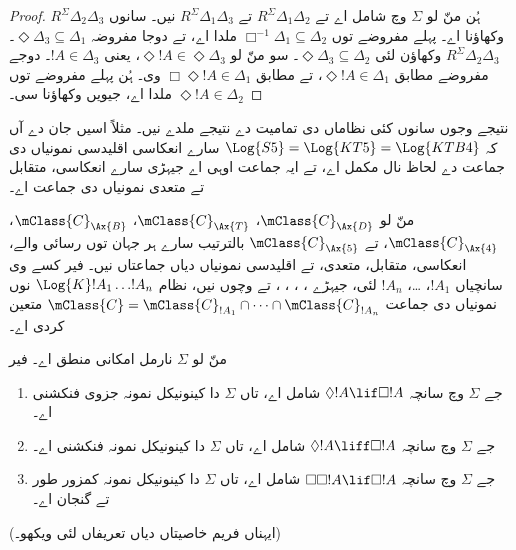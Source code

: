 \documentclass[../../../include/open-logic-section]{subfiles}
\begin{document}
\begin{proof}
  ہُن منّ لو $\Sigma$ وچ  شامل اے تے $R^\Sigma
  \Delta_1\Delta_2$ تے $R^\Sigma \Delta_1\Delta_3$ نیں۔ سانوں
  $R^\Sigma \Delta_2\Delta_3$ وکھاؤنا اے۔ پہلے مفروضے توں
  $\Box^{-1}\Delta_1 \subseteq \Delta_2$ ملدا اے، تے دوجا مفروضہ
  $\Diamond\Delta_3 \subseteq \Delta_1$۔
  $R^\Sigma
  \Delta_2\Delta_3$ وکھاؤن لئی
  $\Diamond\Delta_3 \subseteq \Delta_2$۔ سو منّ لو $\Diamond!A \in
  \Diamond\Delta_3$، یعنی $!A \in \Delta_3$۔ دوجے مفروضے مطابق
  $\Diamond!A \in \Delta_1$، تے  مطابق $\Box\Diamond!A \in
  \Delta_1$ وی۔ ہُن پہلے مفروضے توں $\Diamond!A \in
  \Delta_2$ ملدا اے، جیویں وکھاؤنا سی۔
  \end{proof}

نتیجے وجوں سانوں کئی نظاماں دی تمامیت دے نتیجے ملدے نیں۔ مثلاً اسیں جان دے آں کہ $\Log{S5} = \Log{KT5} =
\Log{KTB4}$ سارے انعکاسی اقلیدسی نمونیاں دی جماعت دے لحاظ نال مکمل اے، تے ایہ جماعت اوہی اے جیہڑی سارے انعکاسی، متقابل تے متعدی نمونیاں دی جماعت اے۔

\begin{thm}
  منّ لو $\mClass{C}_\Ax{D}$، $\mClass{C}_\Ax{T}$،
  $\mClass{C}_\Ax{B}$، $\mClass{C}_\Ax{4}$، تے
  $\mClass{C}_\Ax{5}$ بالترتیب سارے ہر جہان توں رسائی والے، انعکاسی،
  متقابل، متعدی، تے اقلیدسی نمونیاں دیاں جماعتاں نیں۔ فیر کسے وی سانچیاں $!A_1$، \dots، $!A_n$ لئی، جیہڑے ،
  ، ، ، تے  وچوں نیں، نظام
  $\Log{K}!A_1 \dots !A_n$ نوں نمونیاں دی جماعت
  $\mClass{C} = \mClass{C}_{!A_1} \cap \dots
  \cap \mClass{C}_{!A_n}$ متعین کردی اے۔
\end{thm}

\begin{prop}
  منّ لو $\Sigma$ نارمل امکانی منطق اے۔ فیر
  \begin{enumerate}
  \item{}%
    جے $\Sigma$ وچ سانچہ $\Diamond!A \lif \Box
    !A$ شامل اے، تاں $\Sigma$ دا کینونیکل نمونہ جزوی فنکشنی اے۔
  \item جے $\Sigma$ وچ سانچہ $\Diamond!A \liff \Box
    !A$ شامل اے، تاں $\Sigma$ دا کینونیکل نمونہ فنکشنی اے۔
  \item جے $\Sigma$ وچ سانچہ $\Box\Box!A \lif \Box
    !A$ شامل اے، تاں $\Sigma$ دا کینونیکل نمونہ کمزور طور تے گنجان اے۔
  \end{enumerate}
(ایہناں فریم خاصیتاں دیاں تعریفاں لئی  ویکھو۔)
\end{prop}
\end{document}
